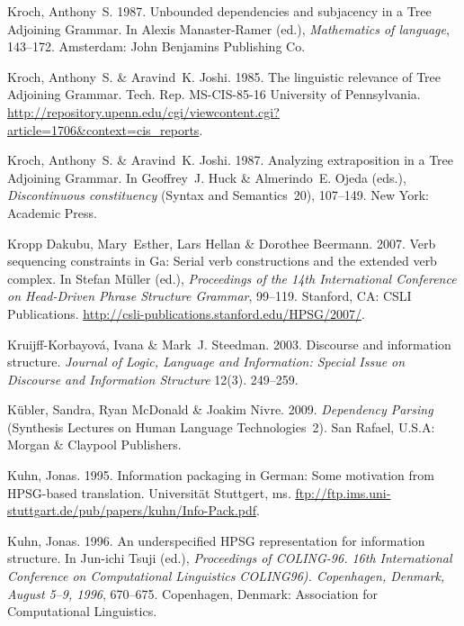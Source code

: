 \begin{thebibliography}{1420}
Kroch, Anthony~S. 1987.
\newblock Unbounded dependencies and subjacency in a {Tree Adjoining Grammar}.
\newblock In Alexis Manaster-Ramer (ed.), \emph{Mathematics of language},
  143--172. Amsterdam: John Benjamins Publishing Co.

Kroch, Anthony~S. \& Aravind~K. Joshi. 1985.
\newblock The linguistic relevance of {Tree Adjoining Grammar}.
\newblock Tech. Rep. MS-CIS-85-16 University of Pennsylvania.
\newblock
  \urlprefix\url{http://repository.upenn.edu/cgi/viewcontent.cgi?article=1706&context=cis_reports}.

Kroch, Anthony~S. \& Aravind~K. Joshi. 1987.
\newblock Analyzing extraposition in a {Tree Adjoining Grammar}.
\newblock In Geoffrey~J. Huck \& Almerindo~E. Ojeda (eds.), \emph{Discontinuous
  constituency} (Syntax and Semantics~20), 107--149. New York: Academic Press.

{Kropp Dakubu}, Mary~Esther, Lars Hellan \& Dorothee Beermann. 2007.
\newblock Verb sequencing constraints in {Ga}: {Serial} verb constructions and
  the extended verb complex.
\newblock In Stefan M{\"u}ller (ed.), \emph{Proceedings of the {14th
  International Conference on Head-Driven Phrase Structure Grammar}}, 99--119.
  Stanford, CA: CSLI Publications.
\newblock \urlprefix\url{http://csli-publications.stanford.edu/HPSG/2007/}.

Kruijff-Korbayov\'{a}, Ivana \& Mark~J. Steedman. 2003.
\newblock Discourse and information structure.
\newblock \emph{Journal of Logic, Language and Information: Special Issue on
  Discourse and Information Structure} 12(3). 249--259.

K{\"u}bler, Sandra, Ryan McDonald \& Joakim Nivre. 2009.
\newblock \emph{{Dependency Parsing}} (Synthesis Lectures on Human Language
  Technologies~2).
\newblock San Rafael, U.S.A: Morgan \& Claypool Publishers.

Kuhn, Jonas. 1995.
\newblock Information packaging in {German}: {Some} motivation from
  {HPSG}-based translation.
\newblock Universit{\"a}t Stuttgert, ms.
\newblock
  \urlprefix\url{ftp://ftp.ims.uni-stuttgart.de/pub/papers/kuhn/Info-Pack.pdf}.

Kuhn, Jonas. 1996.
\newblock An underspecified {HPSG} representation for information structure.
\newblock In {Jun-ichi} Tsuji (ed.), \emph{Proceedings of {COLING-96. 16th
  International Conference on Computational Linguistics COLING96). Copenhagen,
  Denmark, August 5--9, 1996}}, 670--675. Copenhagen, Denmark: Association for
  Computational Linguistics.


\end{thebibliography}
